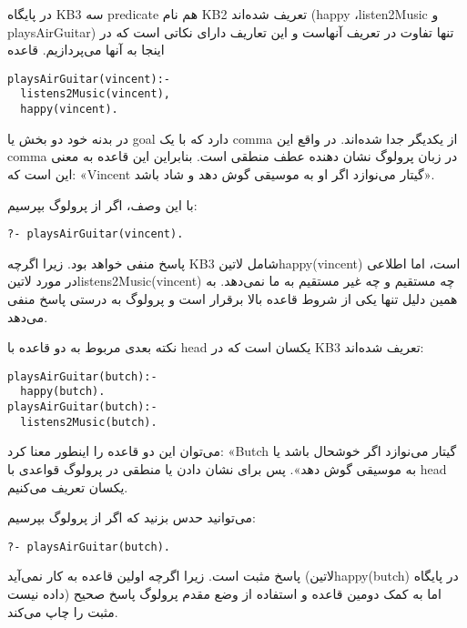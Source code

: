 در پایگاه KB3 سه predicate هم نام KB2 تعریف شده‌اند (happy ،listen2Music و playsAirGuitar) تنها تفاوت در تعریف آنهاست و این تعاریف دارای نکاتی است که در اینجا به آنها می‌پردازیم. قاعده

\begin{latin}
\begin{lstlisting}
playsAirGuitar(vincent):-
  listens2Music(vincent),
  happy(vincent).
\end{lstlisting}
\end{latin}

در بدنه خود دو بخش یا goal دارد که با یک comma از یکدیگر جدا شده‌اند. در واقع این comma در زبان پرولوگ نشان دهنده عطف منطقی است. بنابراین این قاعده به معنی این است که: «Vincent گیتار می‌نوازد اگر او به موسیقی گوش دهد و شاد باشد».

با این وصف، اگر از پرولوگ بپرسیم:

\begin{latin}
\begin{lstlisting}
?- playsAirGuitar(vincent).
\end{lstlisting}
\end{latin}

پاسخ منفی خواهد بود. زیرا اگرچه KB3 شامل ‌لاتین{happy(vincent)} است، اما اطلاعی در مورد ‌لاتین{listens2Music(vincent)} چه مستقیم و چه غیر مستقیم به ما نمی‌دهد. به همین دلیل تنها یکی از شروط قاعده بالا برقرار است و پرولوگ به درستی پاسخ منفی می‌دهد.

نکته بعدی مربوط به دو قاعده با head یکسان است که در KB3 تعریف شده‌اند:

\begin{latin}
\begin{lstlisting}
playsAirGuitar(butch):-
  happy(butch).
playsAirGuitar(butch):-
  listens2Music(butch).
\end{lstlisting}
\end{latin}

می‌توان این دو قاعده را اینطور معنا کرد: «Butch گیتار می‌نوازد اگر خوشحال باشد یا به موسیقی گوش‌ دهد». پس برای نشان دادن یا منطقی در پرولوگ قواعدی با head یکسان تعریف می‌کنیم.

می‌توانید حدس بزنید که اگر از پرولوگ بپرسیم:

\begin{latin}
\begin{lstlisting}
?- playsAirGuitar(butch).
\end{lstlisting}
\end{latin}

پاسخ مثبت است. زیرا اگرچه اولین قاعده به کار نمی‌آید (‌لاتین{happy(butch)} در پایگاه داده نیست) اما به کمک دومین قاعده و استفاده از وضع مقدم پرولوگ پاسخ صحیح مثبت را چاپ می‌کند.

